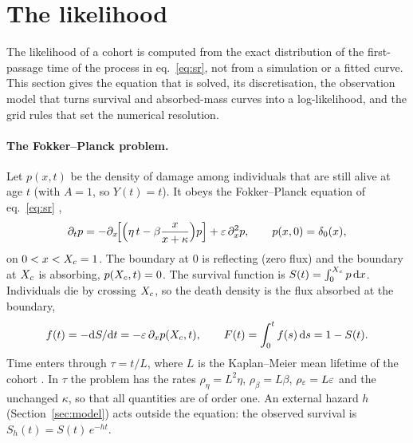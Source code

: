 \section{The likelihood}\label{sec:likelihood}

The likelihood of a cohort is computed from the exact distribution of the first-passage time of the process in
eq.~\eqref{eq:sr}, not from a simulation or a fitted curve. This section gives the equation that is solved, its
discretisation, the observation model that turns survival and absorbed-mass curves into a log-likelihood, and the grid
rules that set the numerical resolution.

\paragraph{The Fokker--Planck problem.} Let $p(x,t)$ be the density of damage among individuals that are still alive
at age $t$ (with $A=1$, so $Y(t)=t$). It obeys the Fokker--Planck equation of eq.~\eqref{eq:sr} \citep{risken1996fokker},
\begin{equation}\label{eq:fp}
  \partial_t p = -\partial_x\!\Bigl[\Bigl(\eta\,t-\beta\frac{x}{x+\kappa}\Bigr)p\Bigr]+\varepsilon\,\partial_x^2 p,
  \qquad p(x,0)=\delta_0(x),
\end{equation}
on $0<x<X_c=1$. The boundary at $0$ is reflecting (zero flux) and the boundary at $X_c$ is absorbing, $p(X_c,t)=0$. The
survival function is $S(t)=\int_0^{X_c}p\,\mathrm{d} x$. Individuals die by crossing $X_c$, so the death density is the flux
absorbed at the boundary,
\begin{equation}\label{eq:flux}
  f(t)=-\mathrm{d} S/\mathrm{d} t=-\varepsilon\,\partial_x p(X_c,t),\qquad F(t)=\int_0^t f(s)\,\mathrm{d} s=1-S(t).
\end{equation}
Time enters through $\tau=t/L$, where $L$ is the Kaplan--Meier mean lifetime of the cohort
\citep{kaplan1958nonparametric}. In $\tau$ the problem has the rates $\rho_\eta=L^2\eta$, $\rho_\beta=L\beta$,
$\rho_\varepsilon=L\varepsilon$ and the unchanged $\kappa$, so that all quantities are of order one. An external hazard $h$ (Section~\ref{sec:model})
acts outside the equation: the observed survival is $S_h(t)=S(t)\,e^{-ht}$.

